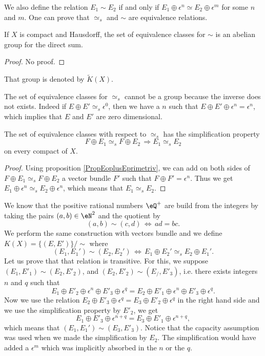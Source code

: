 We also define the relation $E_1\sim E_2$ if and only if $E_1\oplus\epsilon^n\simeq E_2\oplus\epsilon^m$ for some $n$ and $m$. One can prove that $\simeq_s$ and $\sim$ are equivalence relations.

\begin{proposition}
If $X$ is compact and Hausdorff, the set of equivalence classes for $\sim$ is an abelian group for the direct sum.
\end{proposition}

\begin{proof}
No proof.
\end{proof}
That group is denoted by $\tilde K(X)$.  

The set of equivalence classes for $\simeq_s$ cannot be a group because the inverse does not exists. Indeed if $E\oplus E'\simeq_s\epsilon^0$, then we have a $n$ such that $E\oplus E'\oplus\epsilon^n=\epsilon^n$, which implies that $E$ and $E'$ are zero dimensional.

\begin{proposition}
The set of equivalence classes with respect to $\simeq_s$ has the simplification property
\begin{equation}
F\oplus E_1\simeq_s F\oplus E_2\,\Rightarrow E_1\simeq_s E_2
\end{equation}
on every compact of $X$.
\end{proposition}

\begin{proof}
Using proposition \ref{PropEoplusEprimetriv}, we can add on both sides of $F\oplus E_1\simeq_s F\oplus E_2$ a vector bundle $F'$ such that $F\oplus F'=\epsilon^n$. Thus we get $E_1\oplus\epsilon^n\simeq_s E_2\oplus\epsilon^n$, which means that $E_1\simeq_s E_2$.
\end{proof}

We know that the positive rational numbers $\eQ^+$ are build from the integers by taking the pairs $(a,b)\in\eN^2$ and the quotient by
\[ 
  (a,b)\sim(c,d)\,\Leftrightarrow\, ad=bc.
\]
We perform the same construction with vectors bundle and we define $K(X)=\{ (E,E') \}/\sim$ where
\begin{equation}
(E_1,E_1')\sim (E_2,E_2')\,\Leftrightarrow\, E_1\oplus E_2'\simeq_s E_2\oplus E_1'.
\end{equation}
Let us prove that that relation is transitive. For this, we suppose $(E_1,E'_1)\sim (E_2,E'_2)$, and $(E_2,E'_2)\sim(E_/,E'_3)$, i.e. there exists integers $n$ and $q$ such that
\[ 
E_1\oplus E'_2\oplus\epsilon^n\oplus E'_3\oplus\epsilon^q	=E_2\oplus E'_1\oplus\epsilon^n\oplus E'_3\oplus\epsilon^q.
\]
Now we use the relation $E_2\oplus E'_3\oplus\epsilon^q=E_3\oplus E'_2\oplus\epsilon^q$ in the right hand side and we use the simplification property by $E'_2$, we get
\[ 
  E_1\oplus E'_3\oplus\epsilon^{n+q}=E_3\oplus E'_1\oplus\epsilon^{n+q},
\]
which means that $(E_1,E_1')\sim (E_3,E'_3)$. Notice that the capacity assumption was used when we made the simplification by $E_2$. The simplification would have added a $\epsilon^m$ which was implicitly absorbed in the $n$ or the $q$.

